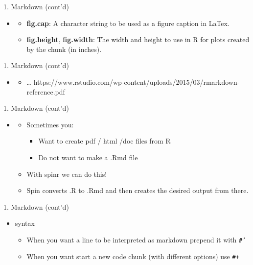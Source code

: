 \documentclass[14pt, aspectratio=169, sectionpage=simple, xclolor=table]{beamer}
\begin{document}
\begin{frame}{1. Markdown (cont'd)}
\begin{itemize}
\item {}
\begin{itemize}
\item \textbf{fig.cap}: A character string to be used as a figure caption in LaTex.
\item \textbf{fig.height}, \textbf{fig.width}: The width and height to use in R for plots created by the chunk (in inches).
\end{itemize}
\end{itemize}
\end{frame}
\begin{frame}{1. Markdown (cont'd)}
\begin{itemize}
\item {}
\begin{itemize}
\item \dots
\nl
https://www.rstudio.com/wp-content/uploads/2015/03/rmarkdown-reference.pdf
\end{itemize}
\end{itemize}
\end{frame}
\begin{frame}{1. Markdown (cont'd)}
\begin{itemize}
\item {}
\begin{itemize}
\item Sometimes you:
\begin{itemize}
\item Want to create pdf / html /doc files from R
\item Do not want to make a .Rmd file 
\end{itemize}
\item With \alert{spinr} we can do this!
\item Spin converts .R to .Rmd and then creates the desired output from there.
\end{itemize}
\end{itemize}
\end{frame}

\begin{frame}{1. Markdown (cont'd)}
\begin{itemize}
\item {} syntax
\begin{itemize}
\item When you want a line to be interpreted as markdown prepend it with \texttt{\#'}
\item When you want start a new code chunk (with different options) use \texttt{\#+}
\end{itemize}
\end{itemize}
\end{frame}
\end{document}
